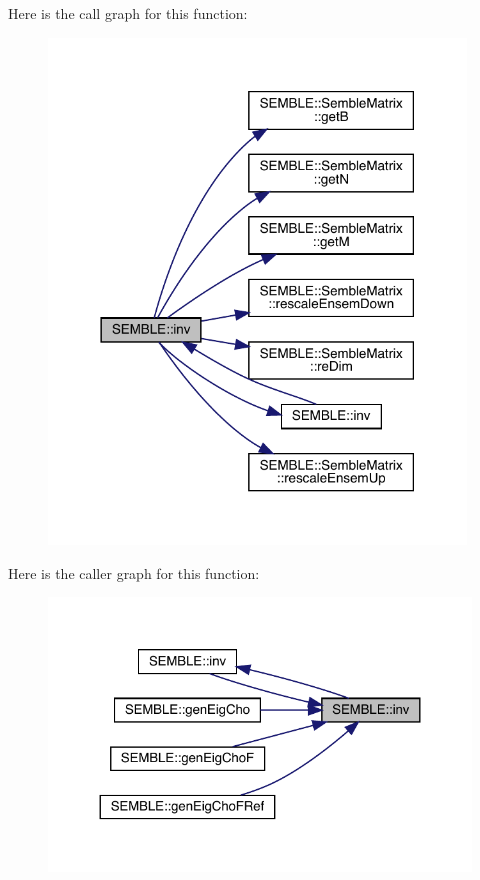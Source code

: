 Here is the call graph for this function\+:
\nopagebreak
\begin{figure}[H]
\begin{center}
\leavevmode
\includegraphics[width=314pt]{d7/dfd/namespaceSEMBLE_aa305667d8c31ec6afd5718f50be47c22_cgraph}
\end{center}
\end{figure}
Here is the caller graph for this function\+:
\nopagebreak
\begin{figure}[H]
\begin{center}
\leavevmode
\includegraphics[width=324pt]{d7/dfd/namespaceSEMBLE_aa305667d8c31ec6afd5718f50be47c22_icgraph}
\end{center}
\end{figure}
\mbox{\label{namespaceSEMBLE_a263c9c3830d08488f8ec27c0d728223e}} 
